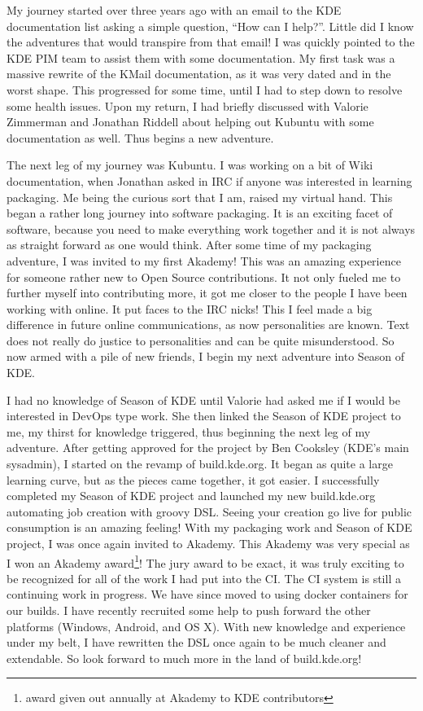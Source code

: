 

\noindent{}My journey started over three years ago with an email to the KDE documentation list asking a simple question, “How can I help?”. Little did I know the adventures that would transpire from that email! I was quickly pointed to the KDE PIM team to assist them with some documentation.  My first task was a massive rewrite of the KMail documentation, as it was very dated and in the worst shape. This progressed for some time, until I had to step down to resolve some health issues. Upon my return, I had briefly discussed with Valorie Zimmerman and Jonathan Riddell about helping out Kubuntu with some documentation as well. Thus begins a new adventure.

The next leg of my journey was Kubuntu. I was working on a bit of Wiki documentation, when Jonathan asked in IRC if anyone was interested in learning packaging. Me being the curious sort that I am, raised my virtual hand. This began a rather long journey into software packaging. It is an exciting facet of software, because you need to make everything work together and it is not always as straight forward as one would think. After some time of my packaging adventure, I was invited to my first Akademy! This was an amazing experience for someone rather new to Open Source contributions. It not only fueled me to further myself into contributing more, it got me closer to the people I have been working with online. It put faces to the IRC nicks! This I feel made a big difference in future online communications, as now personalities are known. Text does not really do justice to personalities and can be quite misunderstood. So now armed with a pile of new friends, I begin my next adventure into Season of KDE.

I had no knowledge of Season of KDE until Valorie had asked me if I would be interested in DevOps type work. She then linked the Season of KDE project to me, my thirst for knowledge triggered, thus beginning the next leg of my adventure. After getting approved for the project by Ben Cooksley (KDE's main sysadmin), I started on the revamp of build.kde.org. It began as quite a large learning curve, but as the pieces came together, it got easier. I successfully completed my Season of KDE project and launched my new build.kde.org automating job creation with groovy DSL.  Seeing your creation go live for public consumption is an amazing feeling! With my packaging work and Season of KDE project, I was once again invited to Akademy. This Akademy was very special as I won an Akademy award\footnote{award given out annually at Akademy to KDE contributors}! The jury award to be exact, it was truly exciting to be recognized for all of the work I had put into the CI. The CI system is still a continuing work in progress. We have since moved to using docker containers for our builds. I have recently recruited some help to push forward the other platforms (Windows, Android, and OS X). With new knowledge and experience under my belt, I have rewritten the DSL once again to be much cleaner and extendable. So look forward to much more in the land of build.kde.org!
